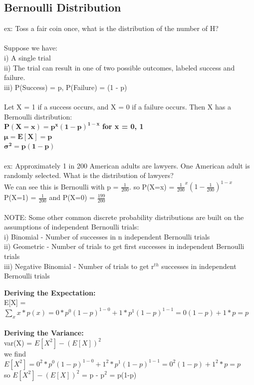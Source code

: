 \documentclass[12pt, a4paper]{article}
\begin{document}
	\subsection{Bernoulli Distribution}
	ex: Toss a fair coin once, what is the distribution of the number of H? \\~\\
	Suppose we have: \\
	i) A single trial \\
	ii) The trial can result in one of two possible outcomes, labeled success and failure. \\
	iii) P(Success) = p, P(Failure) = (1 - p) \\~\\
	Let X = 1 if a success occurs, and X = 0 if a failure occurs. Then X has a Bernoulli distribution: \\
	$\mathbf{P(X=x) = p^x(1-p)^{1-x}}$ \textbf{for x = 0, 1} \\
	$\mathbf{\mu = E[X] = p}$ \\
	$\mathbf{\sigma^2 = p(1-p)}$ \\~\\
	ex: Approximately 1 in 200 American adults are lawyers. One American adult is randomly selected. What is the distribution of lawyers? \\
	We can see this is Bernoulli with p = $\frac{1}{200}$. so P(X=x) = $\frac{1}{200}^x(1-\frac{1}{200})^{1-x}$ \\
	P(X=1) = $\frac{1}{200}$ and P(X=0) = $\frac{199}{200}$ \\~\\
	NOTE: Some other common discrete probability distributions are built on the assumptions of independent Bernoulli trials: \\
	i) Binomial - Number of successes in n independent Bernoulli trials \\
	ii) Geometric - Number of trials to get first successes in independent Bernoulli trials \\
	iii) Negative Binomial -  Number of trials to get r$^{th}$ successes in independent Bernoulli trials \newpage
	
	\noindent \textbf{Deriving the Expectation:} \\
	E[X] = $\sum_x x*p(x) = 0*p^0(1-p)^{1-0} + 1*p^1(1-p)^{1-1} = 0(1-p) + 1*p = p$\\~\\
	\noindent \textbf{Deriving the Variance:} \\
	var(X) = $E[X^2] - (E[X])^2$ \\
	we find $E[X^2] = 0^2*p^0(1-p)^{1-0} + 1^2*p^1(1-p)^{1-1} = 0^2(1-p) + 1^2*p = p$ \\
	so $E[X^2] - (E[X])^2$ = p - p$^2$ = p(1-p) \\~\\
	
\end{document}
